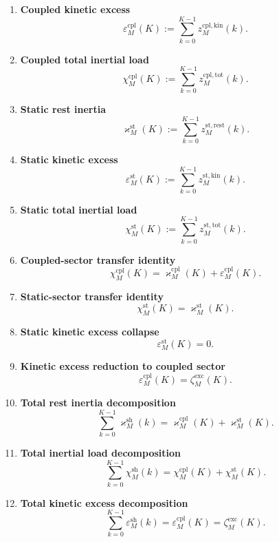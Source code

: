 \documentclass[11pt,letterpaper]{article}
\theoremstyle{plain}
\theoremstyle{definition}
\theoremstyle{remark}
\newcommand{\RestInertia}{\varkappa}
\newcommand{\TotInertia}{\chi}
\newcommand{\KinExcess}{\varepsilon}
\newcommand{\AccAction}{\zeta}
\begin{document}
\begin{enumerate}[resume]
\item \textbf{Coupled kinetic excess}
\[
\KinExcess_M^{\mathrm{cpl}}(K):=\sum_{k=0}^{K-1}z_M^{\mathrm{cpl,kin}}(k).
\]

\item \textbf{Coupled total inertial load}
\[
\TotInertia_M^{\mathrm{cpl}}(K):=\sum_{k=0}^{K-1}z_M^{\mathrm{cpl,tot}}(k).
\]

\item \textbf{Static rest inertia}
\[
\RestInertia_M^{\mathrm{st}}(K):=\sum_{k=0}^{K-1}z_M^{\mathrm{st,rest}}(k).
\]

\item \textbf{Static kinetic excess}
\[
\KinExcess_M^{\mathrm{st}}(K):=\sum_{k=0}^{K-1}z_M^{\mathrm{st,kin}}(k).
\]

\item \textbf{Static total inertial load}
\[
\TotInertia_M^{\mathrm{st}}(K):=\sum_{k=0}^{K-1}z_M^{\mathrm{st,tot}}(k).
\]

\item \textbf{Coupled-sector transfer identity}
\[
\TotInertia_M^{\mathrm{cpl}}(K)
=
\RestInertia_M^{\mathrm{cpl}}(K)+\KinExcess_M^{\mathrm{cpl}}(K).
\]

\item \textbf{Static-sector transfer identity}
\[
\TotInertia_M^{\mathrm{st}}(K)=\RestInertia_M^{\mathrm{st}}(K).
\]

\item \textbf{Static kinetic excess collapse}
\[
\KinExcess_M^{\mathrm{st}}(K)=0.
\]

\item \textbf{Kinetic excess reduction to coupled sector}
\[
\KinExcess_M^{\mathrm{cpl}}(K)=\AccAction_M^{\mathrm{exc}}(K).
\]

\item \textbf{Total rest inertia decomposition}
\[
\sum_{k=0}^{K-1}\RestInertia_M^{\mathrm{sh}}(k)
=
\RestInertia_M^{\mathrm{cpl}}(K)+\RestInertia_M^{\mathrm{st}}(K).
\]

\item \textbf{Total inertial load decomposition}
\[
\sum_{k=0}^{K-1}\TotInertia_M^{\mathrm{sh}}(k)
=
\TotInertia_M^{\mathrm{cpl}}(K)+\TotInertia_M^{\mathrm{st}}(K).
\]

\item \textbf{Total kinetic excess decomposition}
\[
\sum_{k=0}^{K-1}\KinExcess_M^{\mathrm{sh}}(k)
=
\KinExcess_M^{\mathrm{cpl}}(K)=\AccAction_M^{\mathrm{exc}}(K).
\]
\end{enumerate}
\end{document}
